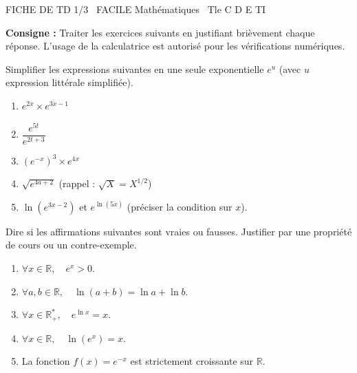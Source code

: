 \documentclass[11pt]{article}
\begin{document}
\begin{tcolorbox}[enhanced,colback=popink,colframe=popink,arc=10pt,boxrule=0pt,left=12pt,right=12pt,top=9pt,bottom=9pt]
{\color{white}\popxbold\small FICHE DE TD 1/3 \textbullet\ FACILE \hfill Mathématiques \textbullet\ Tle C D E TI\par}
\end{tcolorbox}
\vspace{4pt}
\noindent\textbf{Consigne :} Traiter les exercices suivants en justifiant brièvement chaque réponse. L'usage de la calculatrice est autorisé pour les vérifications numériques.

\begin{exercice}
Simplifier les expressions suivantes en une seule exponentielle $e^u$ (avec $u$ expression littérale simplifiée).
\begin{enumerate}
    \item $e^{2x} \times e^{3x-1}$
    \item $\dfrac{e^{5t}}{e^{2t+3}}$
    \item $\left(e^{-x}\right)^3 \times e^{4x}$
    \item $\sqrt{e^{4a+2}}$ \quad (rappel : $\sqrt{X}=X^{1/2}$)
    \item $\ln\left(e^{3x-2}\right)$ \quad et \quad $e^{\ln(5x)}$ (préciser la condition sur $x$).
\end{enumerate}
\end{exercice}

\begin{exercice}
Dire si les affirmations suivantes sont vraies ou fausses. Justifier par une propriété de cours ou un contre-exemple.
\begin{enumerate}
    \item $\forall x \in \mathbb{R},\quad e^{x} > 0$.
    \item $\forall a,b \in \mathbb{R},\quad \ln(a+b) = \ln a + \ln b$.
    \item $\forall x \in \mathbb{R}^*_+,\quad e^{\ln x} = x$.
    \item $\forall x \in \mathbb{R},\quad \ln(e^x) = x$.
    \item La fonction $f(x)=e^{-x}$ est strictement croissante sur $\mathbb{R}$.
\end{enumerate}
\end{exercice}
\end{document}
